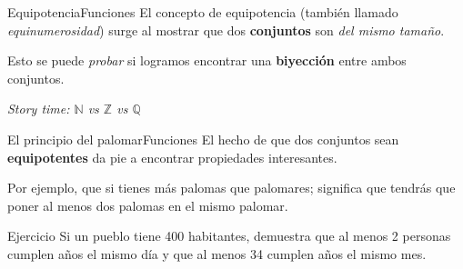 \documentclass[spanish, c]{beamer}
\begin{document}
\begin{frame}{Equipotencia}{Funciones}
    El concepto de \alert{equipotencia} (también llamado \textit{equinumerosidad}) surge al mostrar que dos \textbf{conjuntos} son \textit{del mismo tamaño}. \pause

    \bigskip

    Esto se puede \textit{probar} si logramos encontrar una \textbf{biyección} entre ambos conjuntos. \pause

    \bigskip

    \begin{center}
        \textit{Story time: $\mathbb{N}$ vs $\mathbb{Z}$ vs $\mathbb{Q}$}
    \end{center}

\end{frame}

\begin{frame}{El principio del palomar}{Funciones}
    El hecho de que dos conjuntos sean \textbf{equipotentes} da pie a encontrar propiedades interesantes.
    \pause

    \bigskip

    Por ejemplo, que si tienes más palomas que palomares; significa que tendrás que poner al menos dos palomas en el mismo palomar. \pause

    \bigskip

    \begin{exampleblock}{Ejercicio}
        Si un pueblo tiene 400 habitantes, demuestra que al menos 2 personas cumplen años el mismo día y que al menos 34 cumplen años el mismo mes.
    \end{exampleblock}

\end{frame}






\end{document}
